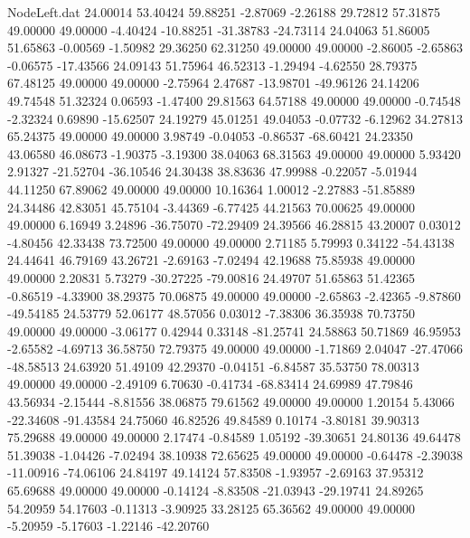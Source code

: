 \begin{filecontents}{NodeLeft.dat}
  24.00014   53.40424   59.88251    -2.87069   -2.26188   29.72812   57.31875   49.00000   49.00000   -4.40424  -10.88251  -31.38783  -24.73114
  24.04063   51.86005   51.65863    -0.00569   -1.50982   29.36250   62.31250   49.00000   49.00000   -2.86005   -2.65863   -0.06575  -17.43566
  24.09143   51.75964   46.52313    -1.29494   -4.62550   28.79375   67.48125   49.00000   49.00000   -2.75964    2.47687  -13.98701  -49.96126
  24.14206   49.74548   51.32324     0.06593   -1.47400   29.81563   64.57188   49.00000   49.00000   -0.74548   -2.32324    0.69890  -15.62507
  24.19279   45.01251   49.04053    -0.07732   -6.12962   34.27813   65.24375   49.00000   49.00000    3.98749   -0.04053   -0.86537  -68.60421
  24.23350   43.06580   46.08673    -1.90375   -3.19300   38.04063   68.31563   49.00000   49.00000    5.93420    2.91327  -21.52704  -36.10546
  24.30438   38.83636   47.99988    -0.22057   -5.01944   44.11250   67.89062   49.00000   49.00000   10.16364    1.00012   -2.27883  -51.85889
  24.34486   42.83051   45.75104    -3.44369   -6.77425   44.21563   70.00625   49.00000   49.00000    6.16949    3.24896  -36.75070  -72.29409
  24.39566   46.28815   43.20007     0.03012   -4.80456   42.33438   73.72500   49.00000   49.00000    2.71185    5.79993    0.34122  -54.43138
  24.44641   46.79169   43.26721    -2.69163   -7.02494   42.19688   75.85938   49.00000   49.00000    2.20831    5.73279  -30.27225  -79.00816
  24.49707   51.65863   51.42365    -0.86519   -4.33900   38.29375   70.06875   49.00000   49.00000   -2.65863   -2.42365   -9.87860  -49.54185
  24.53779   52.06177   48.57056     0.03012   -7.38306   36.35938   70.73750   49.00000   49.00000   -3.06177    0.42944    0.33148  -81.25741
  24.58863   50.71869   46.95953    -2.65582   -4.69713   36.58750   72.79375   49.00000   49.00000   -1.71869    2.04047  -27.47066  -48.58513
  24.63920   51.49109   42.29370    -0.04151   -6.84587   35.53750   78.00313   49.00000   49.00000   -2.49109    6.70630   -0.41734  -68.83414
  24.69989   47.79846   43.56934    -2.15444   -8.81556   38.06875   79.61562   49.00000   49.00000    1.20154    5.43066  -22.34608  -91.43584
  24.75060   46.82526   49.84589     0.10174   -3.80181   39.90313   75.29688   49.00000   49.00000    2.17474   -0.84589    1.05192  -39.30651
  24.80136   49.64478   51.39038    -1.04426   -7.02494   38.10938   72.65625   49.00000   49.00000   -0.64478   -2.39038  -11.00916  -74.06106
  24.84197   49.14124   57.83508    -1.93957   -2.69163   37.95312   65.69688   49.00000   49.00000   -0.14124   -8.83508  -21.03943  -29.19741
  24.89265   54.20959   54.17603    -0.11313   -3.90925   33.28125   65.36562   49.00000   49.00000   -5.20959   -5.17603   -1.22146  -42.20760

\end{filecontents}

